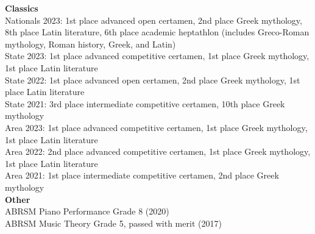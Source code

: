 \documentclass{article}
\begin{document}
\begin{flushleft}
    \vspace{11pt}
    \textbf{Classics}\\
    Nationals 2023: 1st place advanced open certamen, 2nd place Greek mythology, 8th place Latin literature, 6th place academic heptathlon (includes Greco-Roman mythology, Roman history, Greek, and Latin)\\
    State 2023: 1st place advanced competitive certamen, 1st place Greek mythology, 1st place Latin literature\\
    State 2022: 1st place advanced open certamen, 2nd place Greek mythology, 1st place Latin literature\\
    State 2021: 3rd place intermediate competitive certamen, 10th place Greek mythology\\
    Area 2023: 1st place advanced competitive certamen, 1st place Greek mythology, 1st place Latin literature\\
    Area 2022: 2nd place advanced competitive certamen, 1st place Greek mythology, 1st place Latin literature\\
    Area 2021: 1st place intermediate competitive certamen, 2nd place Greek mythology\\

    \vspace{11pt}
    \textbf{Other}\\
    ABRSM Piano Performance Grade 8 (2020)\\
    ABRSM Music Theory Grade 5, passed with merit (2017)\\

\end{flushleft}
\end{document}
